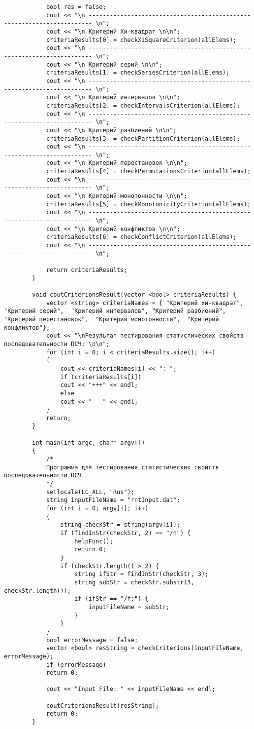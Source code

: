 \documentclass[bachelor, och, coursework]{shiza}
\begin{document}
\begin{verbatim}
			bool res = false;
			cout << "\n ----------------------------------------------------------------------- \n";
			cout << "\n Критерий Хи-квадрат \n\n";
			criteriaResults[0] = checkXiSquareCriterion(allElems);
			cout << "\n ----------------------------------------------------------------------- \n";
			cout << "\n Критерий серий \n\n";
			criteriaResults[1] = checkSeriesCriterion(allElems);
			cout << "\n ----------------------------------------------------------------------- \n";
			cout << "\n Критерий интервалов \n\n";
			criteriaResults[2] = checkIntervalsCriterion(allElems);
			cout << "\n ----------------------------------------------------------------------- \n";
			cout << "\n Критерий разбиений \n\n";
			criteriaResults[3] = checkPartitionCriterion(allElems);
			cout << "\n ----------------------------------------------------------------------- \n";
			cout << "\n Критерий перестановок \n\n";
			criteriaResults[4] = checkPermutationsCriterion(allElems);
			cout << "\n ----------------------------------------------------------------------- \n";
			cout << "\n Критерий монотонности \n\n";
			criteriaResults[5] = checkMonotonicityCriterion(allElems);
			cout << "\n ----------------------------------------------------------------------- \n";
			cout << "\n Критерий конфликтов \n\n";
			criteriaResults[6] = checkConflictCriterion(allElems);
			cout << "\n ----------------------------------------------------------------------- \n";
			
			return criteriaResults;
		}
		
		void coutCriterionsResult(vector <bool> criteriaResults) {
			vector <string> criteriaNames = { "Критерий хи-квадрат", "Критерий серий",  "Критерий интервалов", "Критерий разбиений",  "Критерий перестановок",  "Критерий монотонности",  "Критерий конфликтов"};
			cout << "\nРезультат тестирования статистических свойств последовательности ПСЧ: \n\n";
			for (int i = 0; i < criteriaResults.size(); i++)
			{
				cout << criteriaNames[i] << ": ";
				if (criteriaResults[i])
				cout << "+++" << endl;
				else
				cout << "---" << endl;
			}
			return;
		}
		
		int main(int argc, char* argv[])
		{
			/*
			Программа для тестирования статистических свойств последовательности ПСЧ
			*/
			setlocale(LC_ALL, "Rus");
			string inputFileName = "rntInput.dat";
			for (int i = 0; argv[i]; i++)
			{
				string checkStr = string(argv[i]);
				if (findInStr(checkStr, 2) == "/h") {
					helpFunc();
					return 0;
				}
				if (checkStr.length() > 2) {
					string ifStr = findInStr(checkStr, 3);
					string subStr = checkStr.substr(3, checkStr.length());
					if (ifStr == "/f:") {
						inputFileName = subStr;
					}
				}
			}
			bool errorMessage = false;
			vector <bool> resString = checkCriterions(inputFileName, errorMessage);
			if (errorMessage)
			return 0;
			
			cout << "Input File: " << inputFileName << endl;
			
			coutCriterionsResult(resString);
			return 0;
		}
	\end{verbatim}
		
\end{document}
